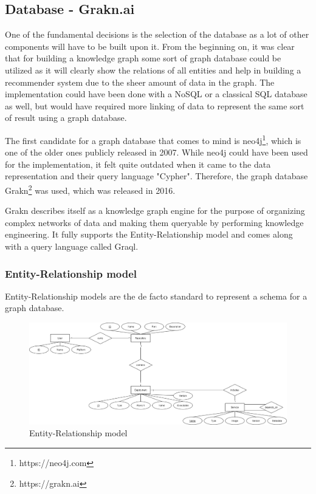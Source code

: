 \subsection{Database - Grakn.ai}
One of the fundamental decisions is the selection of the database as a lot of other components will have to be built upon it. From the beginning on, it was clear that for building a knowledge graph some sort of graph database could be utilized as it will clearly show the relations of all entities and help in building a recommender system due to the sheer amount of data in the graph.
The implementation could have been done with a NoSQL or a classical SQL database as well, but would have required more linking of data to represent the same sort of result using a graph database.

The first candidate for a graph database that comes to mind is neo4j\footnote{https://neo4j.com}, which is one of the older ones publicly released in 2007. While neo4j could have been used for the implementation, it felt quite outdated when it came to the data representation and their query language "Cypher". Therefore, the graph database Grakn\footnote{https://grakn.ai} was used, which was released in 2016.

Grakn describes itself as a knowledge graph engine for the purpose of organizing complex networks of data and making them queryable by performing knowledge engineering. It fully supports the Entity-Relationship model and comes along with a query language called Graql. 

\subsubsection{Entity-Relationship model}
Entity-Relationship models are the de facto standard to represent a schema for a graph database.
\begin{figure}[H]
    \centering
    \includegraphics[width=1.2\paperwidth,height=1.2\paperheight,keepaspectratio,angle=270]{graphics/er_database.png}
    \caption{Entity-Relationship model}
    \label{fig:er_model}
\end{figure}

